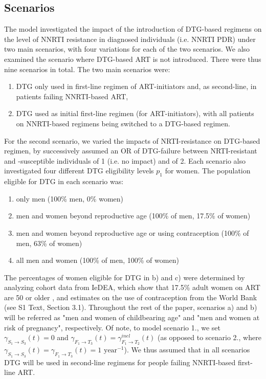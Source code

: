 \documentclass[10pt,letterpaper]{article}
\begin{document}
\subsection*{Scenarios}\label{scen_section}
The model investigated the impact of the introduction of DTG-based regimens on the level of NNRTI resistance in diagnosed individuals (i.e. NNRTI PDR) under two main scenarios, with four variations for each of the two scenarios. We also examined the scenario where DTG-based ART is not introduced. There were thus nine scenarios in total. The two main scenarios were:
\begin{enumerate}
\item DTG only used in first-line regimen of ART-initiators and, as second-line, in patients failing NNRTI-based ART,
\item DTG used as initial first-line regimen (for ART-initiators), with all patients on NNRTI-based regimens being switched to a DTG-based regimen.
\end{enumerate}

For the second scenario, we varied the impacts of NRTI-resistance on DTG-based regimen, by successively assumed an OR of DTG-failure  between NRTI-resistant and -susceptible individuals of 1 (i.e. no impact) and of 2. Each scenario also investigated four different DTG eligibility levels $p_1$ for women. The population eligible for DTG in each scenario was:
\begin{enumerate}[label=\alph*)]
\item only men (100\% men, 0\% women)
\item men and women beyond reproductive age (100\% of men, 17.5\% of women)
\item men and women beyond reproductive age or using contraception (100\% of men, 63\% of women)
\item all men and women (100\% of men, 100\% of women)
\end{enumerate}
The percentages of women eligible for DTG in b) and c) were determined by analyzing cohort data from IeDEA, which show that 17.5\% adult women on ART are 50 or older \cite{Egger2012}, and estimates on the use of contraception from the World Bank \cite{WorldBank2015}(see S1 Text, Section 3.1). Throughout the rest of the paper, scenarios a) and b) will be referred as "men and women of childbearing age" and "men and women at risk of pregnancy", respectively. Of note, to model scenario 1., we set $\gamma_{S_1\rightarrow S_3}^{}(t)=0$ and $\gamma_{F_1\rightarrow T_3}^{}(t)=\gamma_{F_1\rightarrow T_2}^{inel}(t)$ (as opposed to scenario 2., where $\gamma_{S_1\rightarrow S_3}^{}(t)=\gamma_{F_1\rightarrow T_3}^{}(t)=1\text{ year}^{-1}$). We thus assumed that in all scenarios DTG will be used in second-line regimens for people failing NNRTI-based first-line ART.
\end{document}
